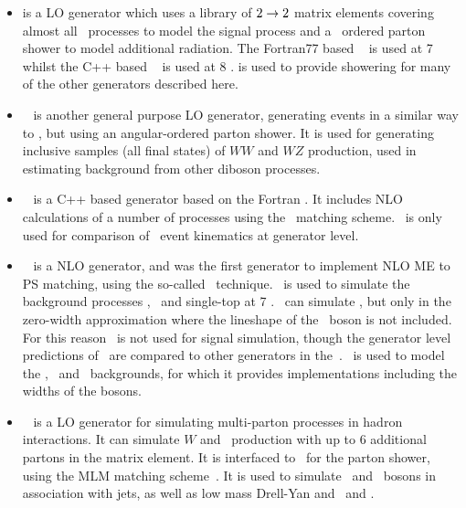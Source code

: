 \begin{itemize}
    \item \pythia is a LO generator which uses a library of $2\rightarrow2$
    matrix elements covering almost all \sm\ processes to model the signal
    process and a \pt\ ordered parton shower to model additional radiation.
    The Fortran77 based
    ~\cite{pythia} is used at 7 \tev\, whilst the C++ based
    ~\cite{Sjostrand:2007gs} is used at 8 \tev. \pythia is used to
    provide showering for many of the other generators described here.

    \item \herwig~\cite{Herwig} is another general purpose LO generator, generating events in a
    similar way to \pythia, but using an angular-ordered parton shower.
    It is used for generating inclusive samples (all final
    states) of $WW$ and $WZ$ production, used in estimating background from
    other diboson processes.

    \item \herwigPP~\cite{Bahr:2008pv} is a C++ based generator based on the
    Fortran \herwig. It includes NLO calculations of a number of processes
    using the \powheg\ matching scheme. \herwigPP\ is only used for comparison
    of \ZZ\ event kinematics at generator level.

    \item \mcatnlo~\cite{Frixione:2002ik} is a NLO generator, and was the first
    generator to implement NLO ME to PS matching, using the so-called \mcatnlo\
    technique. \mcatnlo\ is used to simulate the background processes \ttbar,
    \Wt\ and single-top at 7 \tev. \mcatnlo\ can simulate \qqZZ, but only in the
    zero-width approximation where the lineshape of the \Z\ boson is not
    included. For this reason \mcatnlo\ is not used for signal simulation,
    though the generator level predictions of \mcatnlo\ are compared to other
    generators in the~\chap{TheoryZZProduction}. \mcatnlo\ is used to model the \ttbar,
    \WZ\ and \WW\ backgrounds, for which it provides implementations including
    the widths of the bosons.

    \item \alpgen~\cite{alpgen} is a LO generator for simulating multi-parton
    processes in hadron interactions. It can simulate $W$ and \Z\ production
    with up to 6 additional partons in the matrix element. It is interfaced to
    \herwig\ for the parton shower, using the MLM matching
    scheme~\cite{Mangano2002343}. It is used to simulate \W\ and \Z\ bosons in
    association with jets, as well as low mass Drell-Yan and \Wg\ and \Zg.



\end{itemize}

